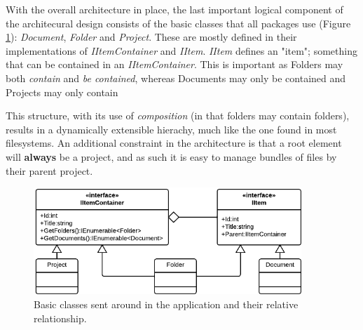 With the overall architecture in place, the last important logical component of the architecural design
consists of the basic classes that all packages use (Figure \ref{fig:basic-classes}): \emph{Document},
\emph{Folder} and \emph{Project}. These are mostly defined in their implementations of \emph{IItemContainer}
and \emph{IItem}. \emph{IItem} defines an "item"; something that can be contained in an
\emph{IItemContainer}. This is important as Folders may both \emph{contain} and \emph{be contained},
whereas Documents may only be contained and Projects may only contain

This structure, with its use of \emph{composition} (in that folders may contain folders), results in a
dynamically extensible hierachy, much like the one found in most filesystems. An additional constraint
in the architecture is that a root element will {\bf always} be a project, and as such it is easy to
manage bundles of files by their parent project.

\begin{figure}[htb]
	\centering
	\includegraphics[width=0.9\textwidth]{Software_architecture/graphics/basic-classes.png}
	\caption{Basic classes sent around in the application and their relative relationship.}
	\label{fig:basic-classes}
\end{figure}